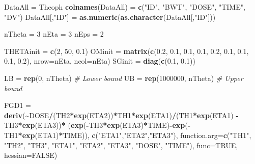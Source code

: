 \documentclass[
  10pt,
  krantz2,
  a4paper]{krantz}
\newenvironment{Shaded}{\begin{snugshade}}{\end{snugshade}}
\newcommand{\CommentTok}[1]{\textcolor[rgb]{0.56,0.35,0.01}{\textit{#1}}}
\newcommand{\DataTypeTok}[1]{\textcolor[rgb]{0.13,0.29,0.53}{#1}}
\newcommand{\DecValTok}[1]{\textcolor[rgb]{0.00,0.00,0.81}{#1}}
\newcommand{\FloatTok}[1]{\textcolor[rgb]{0.00,0.00,0.81}{#1}}
\newcommand{\KeywordTok}[1]{\textcolor[rgb]{0.13,0.29,0.53}{\textbf{#1}}}
\newcommand{\NormalTok}[1]{#1}
\newcommand{\OperatorTok}[1]{\textcolor[rgb]{0.81,0.36,0.00}{\textbf{#1}}}
\newcommand{\OtherTok}[1]{\textcolor[rgb]{0.56,0.35,0.01}{#1}}
\newcommand{\StringTok}[1]{\textcolor[rgb]{0.31,0.60,0.02}{#1}}
\theoremstyle{definition}
\theoremstyle{definition}
\theoremstyle{definition}
\theoremstyle{remark}
\begin{document}
\begin{Shaded}
\begin{Highlighting}[]
\NormalTok{DataAll =}\StringTok{ }\NormalTok{Theoph}
\KeywordTok{colnames}\NormalTok{(DataAll) =}\StringTok{ }\KeywordTok{c}\NormalTok{(}\StringTok{"ID"}\NormalTok{, }\StringTok{"BWT"}\NormalTok{, }\StringTok{"DOSE"}\NormalTok{, }\StringTok{"TIME"}\NormalTok{, }\StringTok{"DV"}\NormalTok{)}
\NormalTok{DataAll[,}\StringTok{"ID"}\NormalTok{] =}\StringTok{ }\KeywordTok{as.numeric}\NormalTok{(}\KeywordTok{as.character}\NormalTok{(DataAll[,}\StringTok{"ID"}\NormalTok{]))}

\NormalTok{nTheta =}\StringTok{ }\DecValTok{3}
\NormalTok{nEta =}\StringTok{ }\DecValTok{3}
\NormalTok{nEps =}\StringTok{ }\DecValTok{2}

\NormalTok{THETAinit =}\StringTok{ }\KeywordTok{c}\NormalTok{(}\DecValTok{2}\NormalTok{, }\DecValTok{50}\NormalTok{, }\FloatTok{0.1}\NormalTok{)}
\NormalTok{OMinit =}\StringTok{ }\KeywordTok{matrix}\NormalTok{(}\KeywordTok{c}\NormalTok{(}\FloatTok{0.2}\NormalTok{, }\FloatTok{0.1}\NormalTok{, }\FloatTok{0.1}\NormalTok{, }\FloatTok{0.1}\NormalTok{, }\FloatTok{0.2}\NormalTok{, }\FloatTok{0.1}\NormalTok{, }\FloatTok{0.1}\NormalTok{, }\FloatTok{0.1}\NormalTok{, }\FloatTok{0.2}\NormalTok{), }
                \DataTypeTok{nrow=}\NormalTok{nEta, }\DataTypeTok{ncol=}\NormalTok{nEta)}
\NormalTok{SGinit =}\StringTok{ }\KeywordTok{diag}\NormalTok{(}\KeywordTok{c}\NormalTok{(}\FloatTok{0.1}\NormalTok{, }\FloatTok{0.1}\NormalTok{))}

\NormalTok{LB =}\StringTok{ }\KeywordTok{rep}\NormalTok{(}\DecValTok{0}\NormalTok{, nTheta) }\CommentTok{\# Lower bound}
\NormalTok{UB =}\StringTok{ }\KeywordTok{rep}\NormalTok{(}\DecValTok{1000000}\NormalTok{, nTheta) }\CommentTok{\# Upper bound}

\NormalTok{FGD1 =}\StringTok{ }\KeywordTok{deriv}\NormalTok{(}\OperatorTok{\textasciitilde{}}\NormalTok{DOSE}\OperatorTok{/}\NormalTok{(TH2}\OperatorTok{*}\KeywordTok{exp}\NormalTok{(ETA2))}\OperatorTok{*}\NormalTok{TH1}\OperatorTok{*}\KeywordTok{exp}\NormalTok{(ETA1)}\OperatorTok{/}\NormalTok{(TH1}\OperatorTok{*}\KeywordTok{exp}\NormalTok{(ETA1) }\OperatorTok{{-}}\StringTok{ }\NormalTok{TH3}\OperatorTok{*}\KeywordTok{exp}\NormalTok{(ETA3))}\OperatorTok{*}
\StringTok{             }\NormalTok{(}\KeywordTok{exp}\NormalTok{(}\OperatorTok{{-}}\NormalTok{TH3}\OperatorTok{*}\KeywordTok{exp}\NormalTok{(ETA3)}\OperatorTok{*}\NormalTok{TIME)}\OperatorTok{{-}}\KeywordTok{exp}\NormalTok{(}\OperatorTok{{-}}\NormalTok{TH1}\OperatorTok{*}\KeywordTok{exp}\NormalTok{(ETA1)}\OperatorTok{*}\NormalTok{TIME)),}
             \KeywordTok{c}\NormalTok{(}\StringTok{"ETA1"}\NormalTok{,}\StringTok{"ETA2"}\NormalTok{,}\StringTok{"ETA3"}\NormalTok{),}
             \DataTypeTok{function.arg=}\KeywordTok{c}\NormalTok{(}\StringTok{"TH1"}\NormalTok{, }\StringTok{"TH2"}\NormalTok{, }\StringTok{"TH3"}\NormalTok{, }\StringTok{"ETA1"}\NormalTok{, }\StringTok{"ETA2"}\NormalTok{, }\StringTok{"ETA3"}\NormalTok{, }\StringTok{"DOSE"}\NormalTok{,}
                           \StringTok{"TIME"}\NormalTok{),}
             \DataTypeTok{func=}\OtherTok{TRUE}\NormalTok{, }\DataTypeTok{hessian=}\OtherTok{FALSE}\NormalTok{)}


\end{Highlighting}
\end{Shaded}
\end{document}
